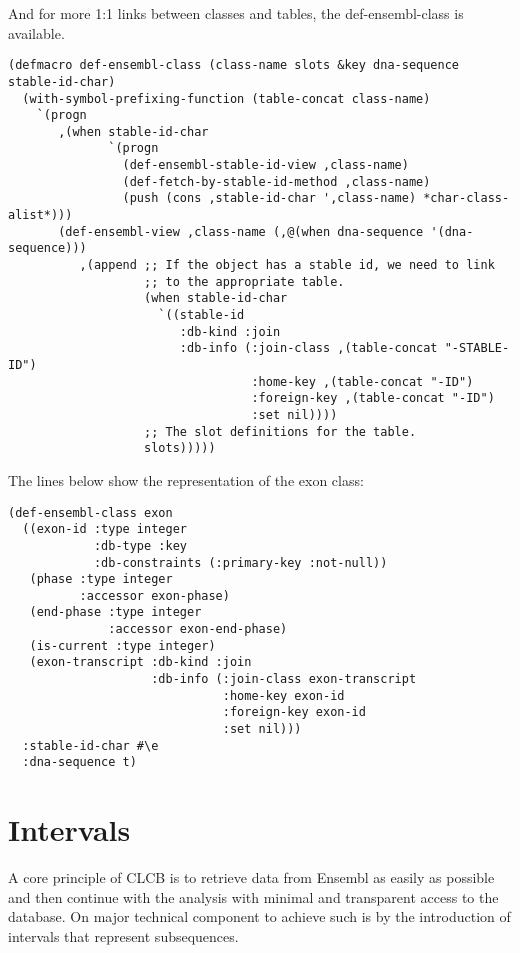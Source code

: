 \documentclass{book}
\newcommand\CLCB{CLCB }
\begin{document}
And for more 1:1 links between classes and tables, the def-ensembl-class is available.

\begin{lstlisting}
(defmacro def-ensembl-class (class-name slots &key dna-sequence stable-id-char)
  (with-symbol-prefixing-function (table-concat class-name)
    `(progn
       ,(when stable-id-char
              `(progn
                (def-ensembl-stable-id-view ,class-name)
                (def-fetch-by-stable-id-method ,class-name)
                (push (cons ,stable-id-char ',class-name) *char-class-alist*)))
       (def-ensembl-view ,class-name (,@(when dna-sequence '(dna-sequence)))
          ,(append ;; If the object has a stable id, we need to link
                   ;; to the appropriate table.
                   (when stable-id-char
                     `((stable-id
                        :db-kind :join
                        :db-info (:join-class ,(table-concat "-STABLE-ID")
                                  :home-key ,(table-concat "-ID")
                                  :foreign-key ,(table-concat "-ID")
                                  :set nil))))
                   ;; The slot definitions for the table.
                   slots)))))
\end{lstlisting}

The lines below show the representation of the exon class:
\begin{lstlisting}
(def-ensembl-class exon
  ((exon-id :type integer
            :db-type :key
            :db-constraints (:primary-key :not-null))
   (phase :type integer
          :accessor exon-phase)
   (end-phase :type integer
              :accessor exon-end-phase)
   (is-current :type integer)
   (exon-transcript :db-kind :join
                    :db-info (:join-class exon-transcript
                              :home-key exon-id
                              :foreign-key exon-id
                              :set nil)))
  :stable-id-char #\e
  :dna-sequence t)
\end{lstlisting}

\section{Intervals}

A core principle of \CLCB is to retrieve data from Ensembl as easily as
possible and then continue with the analysis with minimal and transparent
access to the database. On major technical component to achieve such is
by the introduction of intervals that represent subsequences.
\end{document}
